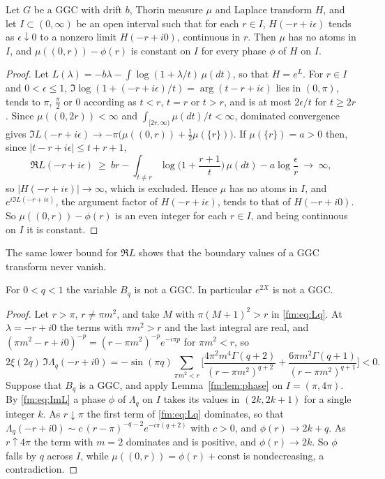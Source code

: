 \begin{lemma}\label{fm:lem:phase}
Let $G$ be a GGC with drift $b$, Thorin measure $\mu$ and Laplace transform $H$, and let $I\subset(0,\infty)$ be an open interval such that for each $r\in I$, $H(-r+i\epsilon)$ tends as $\epsilon\downarrow0$ to a nonzero limit $H(-r+i0)$, continuous in $r$. Then $\mu$ has no atoms in $I$, and $\mu((0,r))-\phi(r)$ is constant on $I$ for every phase $\phi$ of $H$ on $I$.
\end{lemma}

\begin{proof}
Let $L(\lambda)=-b\lambda-\int\log(1+\lambda/t)\,\mu(dt)$, so that $H=e^L$. For $r\in I$ and $0<\epsilon\le1$, $\Im\log(1+(-r+i\epsilon)/t)=\arg(t-r+i\epsilon)$ lies in $(0,\pi)$, tends to $\pi$, $\frac\pi2$ or $0$ according as $t<r$, $t=r$ or $t>r$, and is at most $2\epsilon/t$ for $t\ge2r$. Since $\mu((0,2r))<\infty$ and $\int_{[2r,\infty)}\mu(dt)/t<\infty$, dominated convergence gives $\Im L(-r+i\epsilon)\to-\pi\big(\mu((0,r))+\frac12\mu(\{r\})\big)$. If $\mu(\{r\})=a>0$ then, since $|t-r+i\epsilon|\le t+r+1$,
\[
\Re L(-r+i\epsilon)\ \ge\ br-\int_{t\ne r}\log\Big(1+\frac{r+1}t\Big)\,\mu(dt)-a\log\frac\epsilon r\ \longrightarrow\ \infty,
\]
so $|H(-r+i\epsilon)|\to\infty$, which is excluded. Hence $\mu$ has no atoms in $I$, and $e^{i\Im L(-r+i\epsilon)}$, the argument factor of $H(-r+i\epsilon)$, tends to that of $H(-r+i0)$. So $\mu((0,r))-\phi(r)$ is an even integer for each $r\in I$, and being continuous on $I$ it is constant.
\end{proof}

The same lower bound for $\Re L$ shows that the boundary values of a GGC transform never vanish.

\begin{theorem}\label{fm:thm:notggc}
For $0<q<1$ the variable $B_q$ is not a GGC. In particular $e^{2X}$ is not a GGC.
\end{theorem}

\begin{proof}
Let $r>\pi$, $r\ne\pi m^2$, and take $M$ with $\pi(M+1)^2>r$ in \eqref{fm:eq:Lq}. At $\lambda=-r+i0$ the terms with $\pi m^2>r$ and the last integral are real, and $(\pi m^2-r+i0)^{-p}=(r-\pi m^2)^{-p}e^{-i\pi p}$ for $\pi m^2<r$, so
\begin{equation}\label{fm:eq:ImL}
2\xi(2q)\,\Im\Lambda_q(-r+i0)=-\sin(\pi q)\sum_{\pi m^2<r}\Big[\frac{4\pi^2m^4\Gamma(q+2)}{(r-\pi m^2)^{q+2}}+\frac{6\pi m^2\Gamma(q+1)}{(r-\pi m^2)^{q+1}}\Big]<0 .
\end{equation}
Suppose that $B_q$ is a GGC, and apply Lemma~\ref{fm:lem:phase} on $I=(\pi,4\pi)$. By \eqref{fm:eq:ImL} a phase $\phi$ of $\Lambda_q$ on $I$ takes its values in $(2k,2k+1)$ for a single integer $k$. As $r\downarrow\pi$ the first term of \eqref{fm:eq:Lq} dominates, so that $\Lambda_q(-r+i0)\sim c\,(r-\pi)^{-q-2}e^{-i\pi(q+2)}$ with $c>0$, and $\phi(r)\to2k+q$. As $r\uparrow4\pi$ the term with $m=2$ dominates and is positive, and $\phi(r)\to2k$. So $\phi$ falls by $q$ across $I$, while $\mu((0,r))=\phi(r)+\mathrm{const}$ is nondecreasing, a contradiction.
\end{proof}


